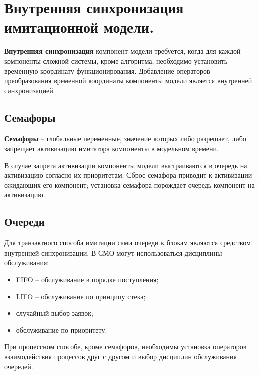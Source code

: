 \section{Внутренняя синхронизация имитационной модели.}

\textbf{Внутренняя синхронизация} компонент модели требуется, когда для каждой компоненты сложной системы, кроме алгоритма, необходимо установить временную координату функционирования. Добавление операторов преобразования временной координаты компоненты модели является внутренней синхронизацией.

\subsection*{Семафоры}

\textbf{Семафоры} -- глобальные переменные, значение которых либо разрешает, либо запрещает активизацию имитатора компоненты в модельном времени.

В случае запрета активизации компоненты модели выстраиваются в очередь на активизацию согласно их приоритетам. Сброс семафора приводит к активизации ожидающих его компонент; установка семафора порождает очередь компонент на активизацию.

\subsection*{Очереди}

Для транзактного способа имитации сами очереди к блокам являются средством внутренней синхронизации. В СМО могут использоваться дисциплины обслуживания:
\begin{itemize}
  \item FIFO -- обслуживание в порядке поступления;
  \item LIFO -- обслуживание по принципу стека;
  \item случайный выбор заявок;
  \item обслуживание по приоритету.
\end{itemize}

При процессном способе, кроме семафоров, необходимы установка операторов взаимодействия процессов друг с другом и выбор дисциплин обслуживания очередей.

\clearpage
